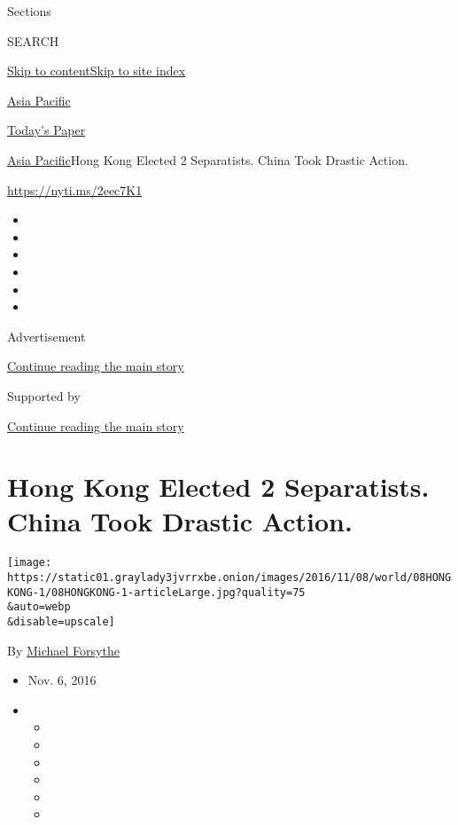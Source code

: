 Sections

SEARCH

\protect\hyperlink{site-content}{Skip to
content}\protect\hyperlink{site-index}{Skip to site index}

\href{https://www.nytimes3xbfgragh.onion/section/world/asia}{Asia
Pacific}

\href{https://myaccount.nytimes3xbfgragh.onion/auth/login?response_type=cookie\&client_id=vi}{}

\href{https://www.nytimes3xbfgragh.onion/section/todayspaper}{Today's
Paper}

\href{/section/world/asia}{Asia Pacific}\textbar{}Hong Kong Elected 2
Separatists. China Took Drastic Action.

\url{https://nyti.ms/2eec7K1}

\begin{itemize}
\item
\item
\item
\item
\item
\item
\end{itemize}

Advertisement

\protect\hyperlink{after-top}{Continue reading the main story}

Supported by

\protect\hyperlink{after-sponsor}{Continue reading the main story}

\hypertarget{hong-kong-elected-2-separatists-china-took-drastic-action}{%
\section{Hong Kong Elected 2 Separatists. China Took Drastic
Action.}\label{hong-kong-elected-2-separatists-china-took-drastic-action}}

\texttt{[image: https://static01.graylady3jvrrxbe.onion/images/2016/11/08/world/08HONGKONG-1/08HONGKONG-1-articleLarge.jpg?quality=75\\\&auto=webp\\\&disable=upscale]}

By \href{http://www.nytimes3xbfgragh.onion/by/michael-forsythe}{Michael
Forsythe}

\begin{itemize}
\item
  Nov. 6, 2016
\item
  \begin{itemize}
  \item
  \item
  \item
  \item
  \item
  \item
  \end{itemize}
\end{itemize}

